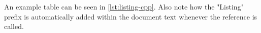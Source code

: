 

An example table can be seen in \ref{lst:listing-cpp}.
Also note how the "Listing" prefix is automatically added within the document text whenever the reference is called.